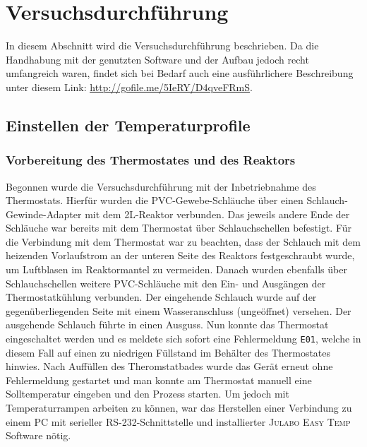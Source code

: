 \section{Versuchsdurchführung}
\label{sec:durchfuerung}
In diesem Abschnitt wird die Versuchsdurchführung beschrieben. Da die Handhabung mit der genutzten Software und der Aufbau jedoch recht umfangreich waren, findet sich bei Bedarf auch eine ausführlichere Beschreibung unter diesem Link: \underline{\url{http://gofile.me/5IeRY/D4qveFRmS}}.
\subsection{Einstellen der Temperaturprofile}
\subsubsection*{Vorbereitung des Thermostates und des Reaktors}
Begonnen wurde die Versuchsdurchführung mit der Inbetriebnahme des Thermostats. Hierfür wurden die PVC-Gewebe-Schläuche über einen Schlauch-Gewinde-Adapter mit dem 2L-Reaktor verbunden. Das jeweils andere Ende der Schläuche war bereits mit dem Thermostat über Schlauchschellen befestigt. Für die Verbindung mit dem Thermostat war zu beachten, dass der Schlauch mit dem heizenden Vorlaufstrom an der unteren Seite des Reaktors festgeschraubt wurde, um Luftblasen im Reaktormantel zu vermeiden. Danach wurden ebenfalls über Schlauchschellen weitere PVC-Schläuche mit den Ein- und Ausgängen der Thermostatkühlung verbunden. Der eingehende Schlauch wurde auf der gegenüberliegenden Seite mit einem Wasseranschluss (ungeöffnet) versehen. Der ausgehende Schlauch führte in einen Ausguss. Nun konnte das Thermostat eingeschaltet werden und es meldete sich sofort eine Fehlermeldung \texttt{E01}, welche in diesem Fall auf einen zu niedrigen Füllstand im Behälter des Thermostates hinwies. Nach Auffüllen des Theromstatbades wurde das Gerät erneut ohne Fehlermeldung gestartet und man konnte am Thermostat manuell eine Solltemperatur eingeben und den Prozess starten. Um jedoch mit Temperaturrampen arbeiten zu können, war das Herstellen einer Verbindung zu einem PC mit serieller RS-232-Schnittstelle und installierter \textsc{Julabo Easy Temp} Software nötig.

